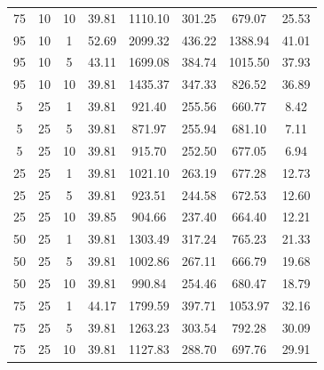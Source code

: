 \begin{table}[H]
\begin{tabular}{ccc|c|c|c|c|c}
75 & 10 & 10 & \cellcolor{gray!80}39.81 & \cellcolor{gray!16}1110.10 & \cellcolor{gray!1}301.25 & \cellcolor{gray!75}679.07 & 25.53\\
95 & 10 & 1 & \cellcolor{gray!1}52.69 & \cellcolor{gray!1}2099.32 & \cellcolor{gray!1}436.22 & \cellcolor{gray!1}1388.94 & 41.01\\
95 & 10 & 5 & \cellcolor{gray!47}43.11 & \cellcolor{gray!1}1699.08 & \cellcolor{gray!1}384.74 & \cellcolor{gray!1}1015.50 & 37.93\\
95 & 10 & 10 & \cellcolor{gray!80}39.81 & \cellcolor{gray!1}1435.37 & \cellcolor{gray!1}347.33 & \cellcolor{gray!29}826.52 & 36.89\\
5 & 25 & 1 & \cellcolor{gray!80}39.81 & \cellcolor{gray!48}921.40 & \cellcolor{gray!7}255.56 & \cellcolor{gray!80}660.77 & 8.42\\
5 & 25 & 5 & \cellcolor{gray!80}39.81 & \cellcolor{gray!56}871.97 & \cellcolor{gray!6}255.94 & \cellcolor{gray!74}681.10 & 7.11\\
5 & 25 & 10 & \cellcolor{gray!80}39.81 & \cellcolor{gray!49}915.70 & \cellcolor{gray!10}252.50 & \cellcolor{gray!75}677.05 & 6.94\\
25 & 25 & 1 & \cellcolor{gray!80}39.81 & \cellcolor{gray!31}1021.10 & \cellcolor{gray!1}263.19 & \cellcolor{gray!75}677.28 & 12.73\\
25 & 25 & 5 & \cellcolor{gray!80}39.81 & \cellcolor{gray!48}923.51 & \cellcolor{gray!17}244.58 & \cellcolor{gray!77}672.53 & 12.60\\
25 & 25 & 10 & \cellcolor{gray!80}39.85 & \cellcolor{gray!51}904.66 & \cellcolor{gray!24}237.40 & \cellcolor{gray!79}664.40 & 12.21\\
50 & 25 & 1 & \cellcolor{gray!80}39.81 & \cellcolor{gray!1}1303.49 & \cellcolor{gray!1}317.24 & \cellcolor{gray!48}765.23 & 21.33\\
50 & 25 & 5 & \cellcolor{gray!80}39.81 & \cellcolor{gray!34}1002.86 & \cellcolor{gray!1}267.11 & \cellcolor{gray!78}666.79 & 19.68\\
50 & 25 & 10 & \cellcolor{gray!80}39.81 & \cellcolor{gray!36}990.84 & \cellcolor{gray!8}254.46 & \cellcolor{gray!74}680.47 & 18.79\\
75 & 25 & 1 & \cellcolor{gray!36}44.17 & \cellcolor{gray!1}1799.59 & \cellcolor{gray!1}397.71 & \cellcolor{gray!1}1053.97 & 32.16\\
75 & 25 & 5 & \cellcolor{gray!80}39.81 & \cellcolor{gray!1}1263.23 & \cellcolor{gray!1}303.54 & \cellcolor{gray!40}792.28 & 30.09\\
75 & 25 & 10 & \cellcolor{gray!80}39.81 & \cellcolor{gray!13}1127.83 & \cellcolor{gray!1}288.70 & \cellcolor{gray!69}697.76 & 29.91\\

\end{tabular}
\end{table}
